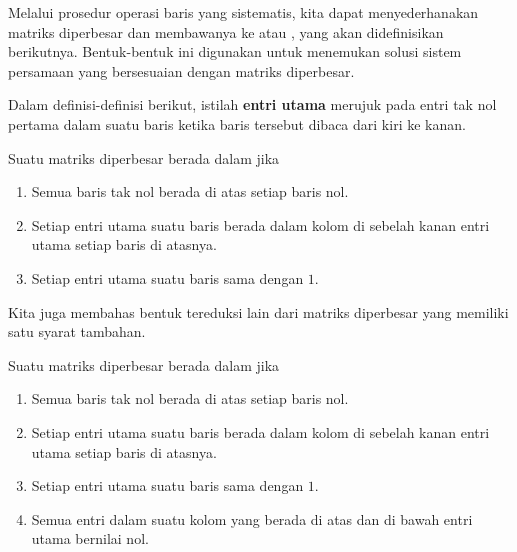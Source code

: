Melalui prosedur operasi baris yang
sistematis, kita dapat menyederhanakan matriks diperbesar dan membawanya ke \textbf{\ef} atau \textbf{\rref}, yang akan didefinisikan berikutnya. Bentuk-bentuk
ini digunakan untuk menemukan solusi sistem persamaan yang bersesuaian dengan matriks diperbesar.

Dalam definisi-definisi berikut, istilah
\textbf{entri utama}
merujuk pada
 entri tak nol pertama dalam suatu baris ketika baris tersebut dibaca
dari kiri ke kanan.

\begin{definition}{\EF}\label{def:echelonform}
Suatu matriks diperbesar berada
\index{\ef} dalam \textbf{\ef} jika

\begin{enumerate}
\item Semua baris tak nol berada di atas setiap baris nol.

\item Setiap entri utama suatu baris berada dalam kolom di sebelah kanan entri utama setiap baris di atasnya.


\item Setiap entri utama suatu baris sama dengan $1$.

\end{enumerate}
\end{definition}

Kita juga membahas bentuk tereduksi lain dari matriks diperbesar yang memiliki satu syarat tambahan.


\begin{definition}{\RREF}\label{def:rref}
Suatu matriks
\index{\rref} diperbesar berada dalam \textbf{\rref } jika

\begin{enumerate}
\item Semua baris tak nol berada di atas setiap baris nol.

\item Setiap entri utama suatu baris berada dalam kolom di sebelah kanan entri utama
setiap baris di atasnya.

\item Setiap entri utama suatu baris sama dengan $1$.

\item Semua entri dalam suatu kolom yang berada di atas dan di bawah entri utama bernilai nol.

\end{enumerate}
\end{definition}

